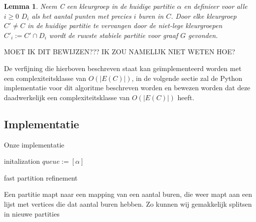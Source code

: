 \documentclass[twoside]{article}
\newtheorem{lemma}[theorem]{Lemma}
\begin{document}
\begin{multicols}{2}
\begin{lemma}
Neem C een kleurgroep in de huidige partitie $\alpha$ en definieer voor alle $i \geq 0$ $D_{i}$ als het aantal punten met precies $i$ buren in $C$. Door elke kleurgroep $C' \neq C$ in de huidige partitie te vervangen door de niet-lege kleurgroepen $C'_{i} := C'\cap D_{i}$ wordt de ruwste stabiele partitie voor graaf $G$ gevonden.
\end{lemma}

MOET IK DIT BEWIJZEN??? IK ZOU NAMELIJK NIET WETEN HOE?

De verfijning die hierboven beschreven staat kan ge\"implementeerd worden met een complexiteitsklasse van $O(|E(C)|)$, in de volgende sectie zal de Python implementatie voor dit algoritme beschreven worden en bewezen worden dat deze daadwerkelijk een complexiteitsklasse van $O(|E(C)|)$ heeft.

\subsection{Implementatie}
Onze implementatie 


\begin{algorithm}[H]
initalization \;
 $queue := [\alpha]$\;

 \caption{fast partition refinement}
\end{algorithm}
\pagebreak

\begin{algorithm}[H]
Een partitie mapt naar een mapping van een aantal buren, die weer mapt aan een lijst met vertices die dat aantal buren hebben. Zo kunnen wij gemakkelijk splitsen in nieuwe partities \;



\end{algorithm}
\end{multicols}
\end{document}
